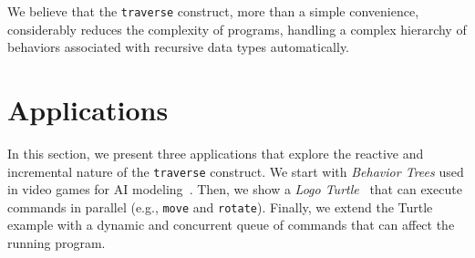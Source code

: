 \documentclass{sig-alternate}
\newcommand{\CEU}{\textsc{C\'{e}u}\xspace}
\newcommand{\code}[1] {{\small{\texttt{#1}}}}
\begin{document}
We believe that the \code{traverse} construct, more than a simple convenience, 
considerably reduces the complexity of programs, handling a complex hierarchy 
of behaviors associated with recursive data types automatically.

\section{Applications}
\label{sec.apps}

In this section, we present three applications that explore the reactive and 
incremental nature of the \code{traverse} construct.
We start with \emph{Behavior Trees} used in video games for AI 
modeling~\cite{isla2005,hecker2009my}.
Then, we show a \emph{Logo Turtle}~\cite{papert.logo} that can execute commands 
in parallel (e.g., \code{move} and \code{rotate}).
Finally, we extend the Turtle example with a dynamic and concurrent queue of 
commands that can affect the running program.
\end{document}
